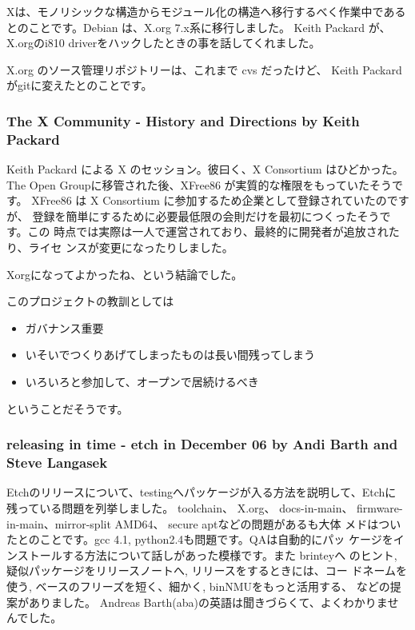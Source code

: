 \documentclass[mingoth,a4paper]{jsarticle}
\begin{document}
Xは、モノリシックな構造からモジュール化の構造へ移行するべく作業中である
とのことです。Debian は、X.org 7.x系に移行しました。 Keith Packard が、
X.orgのi810 driverをハックしたときの事を話してくれました。

X.org のソース管理リポジトリーは、これまで cvs だったけど、 Keith
Packard がgitに変えたとのことです。

\subsubsection{The X Community - History and Directions by Keith Packard}

Keith Packard による X のセッション。彼曰く、X Consortium はひどかった。
The Open Groupに移管された後、XFree86 が実質的な権限をもっていたそうです。
XFree86 は X Consortium に参加するため企業として登録されていたのですが、
登録を簡単にするために必要最低限の会則だけを最初につくったそうです。この
時点では実際は一人で運営されており、最終的に開発者が追放されたり、ライセ
ンスが変更になったりしました。

Xorgになってよかったね、という結論でした。

このプロジェクトの教訓としては

\begin{itemize}
 \item ガバナンス重要
 \item いそいでつくりあげてしまったものは長い間残ってしまう
 \item いろいろと参加して、オープンで居続けるべき
\end{itemize}

ということだそうです。

\subsubsection{releasing in time - etch in December 06 by Andi Barth and Steve Langasek }


Etchのリリースについて、testingへパッケージが入る方法を説明して、Etchに
残っている問題を列挙しました。 toolchain、 X.org、 docs-in-main、
firmware-in-main、mirror-split AMD64、 secure aptなどの問題があるも大体
メドはついたとのことです。gcc 4.1, python2.4も問題です。QAは自動的にパッ
ケージをインストールする方法について話しがあった模様です。また brinteyへ
のヒント, 疑似パッケージをリリースノートへ, リリースをするときには、コー
ドネームを使う, ベースのフリーズを短く、細かく, binNMUをもっと活用する、
などの提案がありました。
Andreas Barth(aba)の英語は聞きづらくて、よくわかりませんでした。
\end{document}
